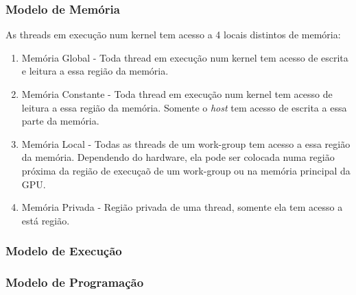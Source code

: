 \subsubsection{Modelo de Memória}
As threads em execução num kernel tem acesso a 4 locais distintos de memória:

\begin{enumerate}
  \item Memória Global - Toda thread em execução num kernel tem acesso de escrita e leitura a essa região da memória.
  \item Memória Constante - Toda thread em execução num kernel tem acesso de leitura a essa região da memória. Somente o \textit{host} tem acesso de
    escrita a essa parte da memória.
  \item Memória Local - Todas as threads de um work-group tem acesso a essa região da memória. Dependendo do hardware, ela pode ser colocada numa região próxima
    da região de execuçaõ de um work-group ou na memória principal da GPU.
  \item Memória Privada - Região privada de uma thread, somente ela tem acesso a está região.
\end{enumerate}

\subsubsection{Modelo de Execução}
\subsubsection{Modelo de Programação}
